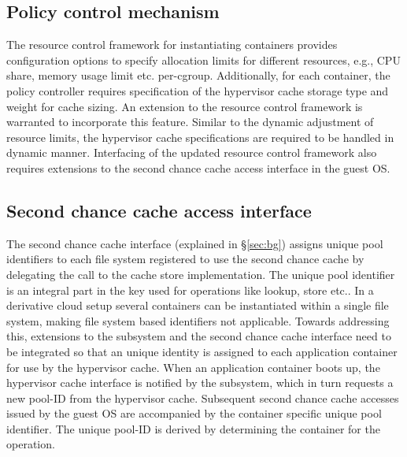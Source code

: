 \subsection{Policy control mechanism}
The \cgroup{} resource control framework for instantiating containers
provides configuration options to specify allocation limits 
for different resources, e.g.,
CPU share, memory usage limit etc. per-cgroup.
%
Additionally, for each container, the \dd{} policy controller requires 
specification of the hypervisor cache storage type and weight for cache sizing.
%
An extension to the \cgroup{} resource control framework is warranted to 
incorporate this feature.
%
Similar to the dynamic adjustment of resource limits, the hypervisor
cache specifications are required to be handled in dynamic manner.
%
%
Interfacing of the updated \cgroup{} resource control framework 
also requires extensions to the second chance cache access 
interface in the guest OS.

\subsection{Second chance cache access interface}
The second chance cache interface (explained in \S\ref{sec:bg}) 
assigns unique pool identifiers to each file system registered to use the 
second chance cache by delegating the call to the cache store
implementation.
%
The unique pool identifier is an integral part in the key 
used for operations like lookup, store etc..
%
%
In a derivative cloud setup several containers can be instantiated 
within a single file system, making file system based identifiers 
not applicable.
%
Towards addressing this, extensions to the \cgroups{} subsystem and 
the second chance cache interface need to be integrated so that 
an unique identity is assigned to each application container 
for use by the hypervisor cache.
%
When an application container boots up, the hypervisor cache interface 
is notified by the \cgroups{} subsystem, which in turn
requests a new pool-ID from the hypervisor cache.
%
Subsequent second chance cache accesses 
issued by the guest OS are accompanied by the container specific
unique pool identifier.
%
The unique pool-ID is derived by determining the container for the 
operation.
%
%
%
